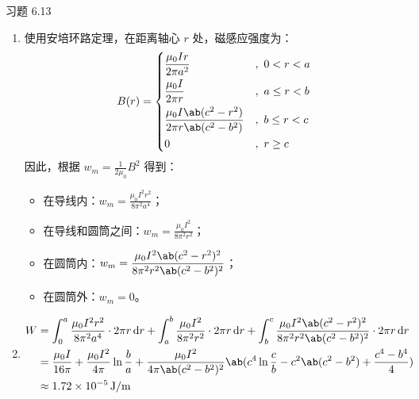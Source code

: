 \begin{problem}
	习题 6.13
	\begin{solution}
		\begin{enumerate}
			\item[\textbf{1)}] 使用安培环路定理，在距离轴心 $r$ 处，磁感应强度为：
			$$
			B(r) = \begin{dcases}
				\frac{\mu_0 I r}{2 \pi a^2} &,\ 0 < r < a \\
				\frac{\mu_0 I}{2 \pi r} &,\ a \le r < b \\
				\frac{\mu_0 I \ab(c^2 - r^2)}{2 \pi r \ab(c^2 - b^2)} &,\ b \le r < c \\
				0 &,\ r \ge c
			\end{dcases}
			$$
			因此，根据 $w_m = \frac{1}{2 \mu_0} B^2$ 得到：
			\begin{itemize}
				\item 在导线内：$\displaystyle w_m = \frac{\mu_0 I^2 r^2}{8 \pi^2 a^{4}}$；
				\item 在导线和圆筒之间：$\displaystyle w_m = \frac{\mu_0 I^2}{8 \pi^2 r^2}$；
				\item 在圆筒内：$\displaystyle w_m = \frac{\mu_0 I^2 \ab(c^2 - r^2)^2}{8 \pi^2 r^2 \ab(c^2 - b^2)^2}$；
				\item 在圆筒外：$w_m = 0$。
			\end{itemize}

			\item[\textbf{2)}]
			$$
			\begin{aligned}
				W & = \int_{0}^{a} \frac{\mu_0 I^2 r^2}{8 \pi^2 a^{4}} \cdot 2 \pi r \dd{r} + \int_{a}^{b} \frac{\mu_0 I^2}{8 \pi^2 r^2} \cdot 2 \pi r \dd{r} + \int_{b}^{c} \frac{\mu_0 I^2 \ab(c^2 - r^2)^2}{8 \pi^2 r^2 \ab(c^2 - b^2)^2} \cdot 2 \pi r \dd{r} \\
				& = \frac{\mu_0 I}{16 \pi} + \frac{\mu_0 I^2}{4\pi} \ln \frac{b}{a} + \frac{\mu_0 I^2}{4\pi \ab(c^2 - b^2)^2} \ab(c^{4} \ln \frac{c}{b} - c^2 \ab(c^2 - b^2) + \frac{c^{4} - b^{4}}{4}) \\
				& \approx 1.72 \times 10^{-5} \,\mathrm{J / m}
			\end{aligned}
			$$
		\end{enumerate}
	\end{solution}
\end{problem}